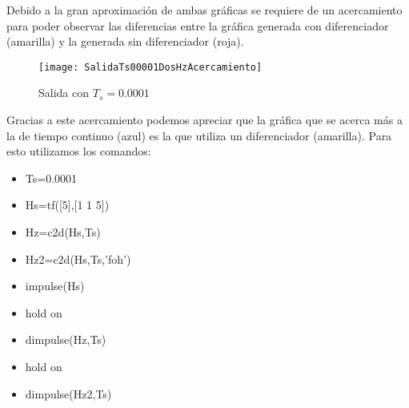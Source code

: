 Debido a la gran aproximación de ambas gráficas se requiere de un acercamiento para poder observar las diferencias entre la gráfica generada con diferenciador (amarilla) y la generada sin diferenciador (roja).

\begin{figure}[H]
	\centering
	\texttt{[image: SalidaTs00001DosHzAcercamiento]}
	\caption{{Salida con $T_s=0.0001$}}
	\label{fig:salidaTs001-2}
\end{figure}

Gracias a este acercamiento podemos apreciar que la gráfica que se acerca más a la de tiempo continuo (azul) es la que utiliza un diferenciador (amarilla). Para esto utilizamos los comandos:

\begin{itemize}
\item Ts=0.0001
\item Hs=tf([5],[1 1 5])
\item Hz=c2d(Hs,Ts)
\item Hz2=c2d(Hs,Ts,'foh')
\item impulse(Hs)
\item hold on
\item dimpulse(Hz,Ts)
\item hold on
\item dimpulse(Hz2,Ts)
\end{itemize}
